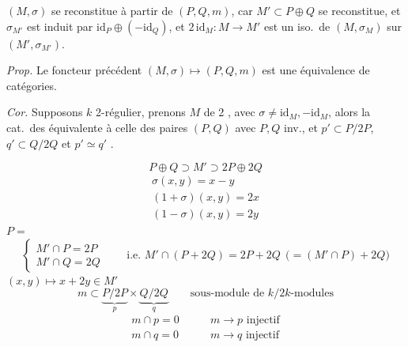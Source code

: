 \documentclass[11pt,a4paper]{article}
\begin{document}
 \struck{\ill{}} $(M, \sigma)$ se reconstitue à partir
de $(P, Q, m)$, car $M' \subset P \oplus Q$ se reconstitue, et
\struck{\ill{}} $\sigma_{M'}$ est induit par
$\mathrm{id}_{P} \oplus (-\mathrm{id}_{Q})$, et
$2\,\mathrm{id}_{M} : M \to M'$ est un iso.\ de $(M, \sigma_{M})$ sur
$(M', \sigma_{M'})$.

\emph{Prop.} Le foncteur précédent $(M, \sigma) \longmapsto (P, Q, m)$ est une
équivalence de catégories.

\emph{Cor.} Supposons $k$ \struck{\ill{}}  2-régulier, prenons
\struck{\ill{}} $M$   de
 2 , avec $\sigma \neq \mathrm{id}_{M}, -\mathrm{id}_{M}$,
alors la cat.\ des \struck{\ill{}}  
\ill{}  équivalente à celle des paires $(P, Q)$ avec $P, Q$
inv., et $p' \subset P/2P$, $q' \subset Q/2Q$ et $p' \simeq q'$ .


\[
  P \oplus Q \supset M' \supset 2P \oplus 2Q
\]
\[
\begin{array}{l}
  \sigma(x, y) = x - y \\
  (1 + \sigma)(x, y) = 2x \\
  (1 - \sigma)(x, y) = 2y
\end{array}
\]
$P =$ 
\[
\begin{cases}
  M' \cap P = 2P \\
  M' \cap Q = 2Q
\end{cases}
\qquad \text{i.e.\ } M' \cap (P + 2Q) = 2P + 2Q
\ \ \bigl(= (M' \cap P) + 2Q\bigr)
\]
$(x, y) \mapsto x + 2y \in M'$
\[
  m \subset \underbrace{P/2P}_{p} \times \underbrace{Q/2Q}_{q}
  \qquad \text{sous-module de } k/2k\text{-modules}
\]
\[
\begin{array}{ll}
  m \cap p = 0 & \qquad m \to p \text{ injectif} \\
  m \cap q = 0 & \qquad m \to q \text{ injectif}
\end{array}
\]
\end{document}
